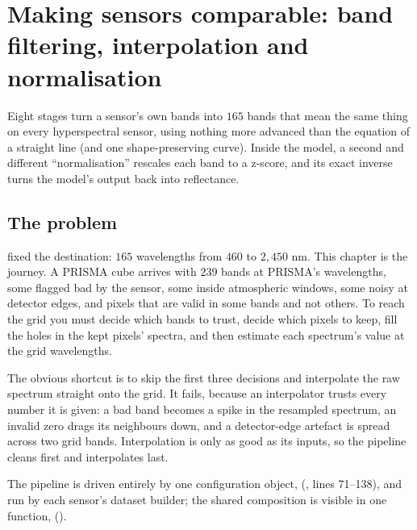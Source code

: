 \chapter{Making sensors comparable: band filtering, interpolation and normalisation}\label{ch:bandpipeline}

\begin{onething}
Eight stages turn a sensor's own bands into $165$ bands that mean the same thing on every
hyperspectral sensor, using nothing more advanced than the equation of a straight line (and one
shape-preserving curve). Inside the model, a second and different ``normalisation'' rescales each
band to a z-score, and its exact inverse turns the model's output back into reflectance.
\end{onething}

\section{The problem}\label{sec:bandpipeline:problem}

 fixed the destination: $165$ wavelengths from $460$ to $2{,}450$ nm. This chapter
is the journey. A PRISMA cube arrives with $239$ bands at PRISMA's wavelengths, some flagged bad by
the sensor, some inside atmospheric windows, some noisy at detector edges, and pixels that are
valid in some bands and not others. To reach the grid you must decide which bands to trust, decide
which pixels to keep, fill the holes in the kept pixels' spectra, and then estimate each spectrum's
value at the grid wavelengths.

The obvious shortcut is to skip the first three decisions and interpolate the raw spectrum straight
onto the grid. It fails, because an interpolator trusts every number it is given: a bad band
becomes a spike in the resampled spectrum, an invalid zero drags its neighbours down, and a
detector-edge artefact is spread across two grid bands. Interpolation is only as good as its
inputs, so the pipeline cleans first and interpolates last.

The pipeline is driven entirely by one configuration object, 
(, lines 71--138), and run by each sensor's dataset builder;
the shared composition is visible in one function, 
().

